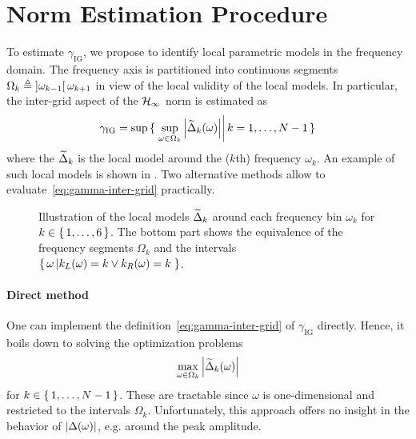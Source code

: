 \section{\Hinf{} Norm Estimation Procedure}
\label{sec:LPMHinf}
To estimate $\gamma_{\mathrm{IG}}$, we propose to identify local parametric models in the frequency domain.
The frequency axis is partitioned into continuous segments $\Omega_k \triangleq \left]  \omega_{k-1}  \right[{ \omega_{k+1} }$ in view of the local validity of the local models.
In particular, the inter-grid aspect of the $\mathcal{H}_{\infty}$ norm is estimated as
\begin{equation}
  \gamma_{\mathrm{IG}} = 
    \sup \set{ \left. 
                \sup_{\omega \in \Omega_k}  \left| \ensuremath{\widetilde{\Delta}}_k(\omega) \right|
                \right|
                k = 1,\ldots,N-1
                }
   \label{eq:gamma-inter-grid}
\end{equation}
where the $\widetilde{\Delta}_{k}$ is the local model around the ($k$th) frequency $\omega_k$.
An example of such local models is shown in .
Two alternative methods allow to evaluate~\eqref{eq:gamma-inter-grid} practically.

\begin{figure}
  \centering
  \setlength{\figurewidth}{0.8\columnwidth}
  \setlength{\figureheight}{0.68\figurewidth}
  
  \caption{Illustration of the local models $\widetilde{\Delta}_k$ around each frequency bin $\omega_k$ for $k\in\set{1,\ldots,6}$.
  The bottom part shows the equivalence of the frequency segments $\Omega_k$ and the intervals $\set{\omega \left| k_L(\omega) = k \vee k_R(\omega) = k \right.}$.}
\label{fig:interpol-quantities}
\end{figure}

\vspace{-3em}
\paragraph*{Direct method}
One can implement the definition~\eqref{eq:gamma-inter-grid} of $\gamma_{\mathrm{IG}}$ directly.
Hence, it boils down to solving the optimization problems
\begin{equation}
      \max_{\omega \in \Omega_k} 
      \left| \widetilde{\Delta}_k(\omega) \right|
      \label{eq:gamma-direct}
\end{equation}
for $k \in \set{1,\ldots,N-1}$.
These are tractable since $\omega$ is one-dimensional and restricted to the intervals $\Omega_k$.
Unfortunately, this approach offers no insight in the behavior of $\left| \Delta(\omega) \right|$, e.g. around the peak amplitude.

